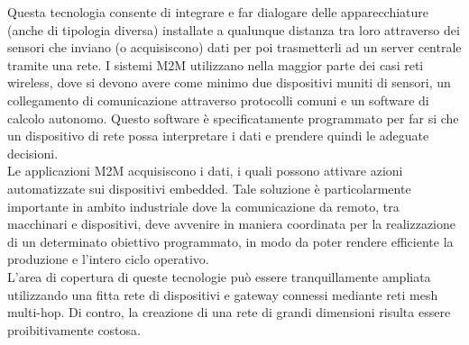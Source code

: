 \noindent Questa tecnologia consente di integrare e far dialogare delle apparecchiature (anche di tipologia diversa) installate a qualunque distanza tra loro attraverso dei sensori che inviano (o acquisiscono) dati per poi trasmetterli ad un server centrale tramite una rete. 
I sistemi M2M utilizzano nella maggior parte dei casi reti wireless, dove si devono avere come minimo due dispositivi muniti di sensori, un collegamento di comunicazione attraverso protocolli comuni e un software di calcolo autonomo. Questo software è specificatamente programmato per far si che un dispositivo di rete possa interpretare i dati e prendere quindi le adeguate decisioni.\\
Le applicazioni M2M acquisiscono i dati, i quali possono attivare azioni automatizzate sui dispositivi embedded. Tale soluzione è particolarmente importante in ambito industriale dove la comunicazione da remoto, tra macchinari e dispositivi, deve avvenire in maniera coordinata per la realizzazione di un determinato obiettivo programmato, in modo da poter rendere efficiente la produzione e l’intero ciclo operativo.\\

\noindent %
L'area di copertura di queste tecnologie può essere tranquillamente ampliata utilizzando una fitta rete di dispositivi e gateway connessi mediante reti mesh multi-hop. Di contro, la creazione di una rete di grandi dimensioni risulta essere proibitivamente costosa.



